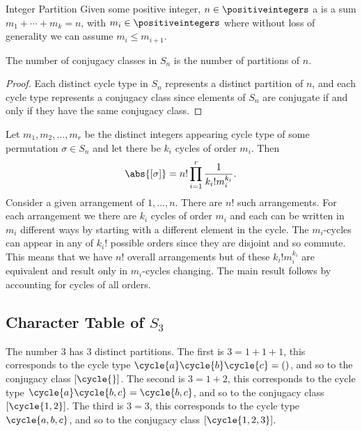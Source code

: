 \begin{dfn}{Integer Partition}{}
    Given some positive integer, \(n \in \positiveintegers\) a
     is a sum \(m_1 + \dotsb + m_k = n\), with \(m_i
    \in \positiveintegers\) where without loss of generality we can assume \(m_i \le
    m_{i + 1}\).
\end{dfn}

\begin{crl}{}{}
    The number of conjugacy classes in \(S_n\) is the number of partitions
    of \(n\).
    \begin{proof}
        Each distinct cycle type in \(S_n\) represents a distinct partition
        of \(n\), and each cycle type represents a conjugacy class since elements of
        \(S_n\) are conjugate if and only if they have the same conjugacy class.
    \end{proof}
\end{crl}

\begin{crl}{}{}
    Let \(m_1, m_2, \dotsc, m_r\) be the distinct integers appearing cycle
    type of some permutation \(\sigma \in S_n\) and let there be \(k_i\) cycles of
    order \(m_i\).
    Then
    \begin{equation}
        \abs{[\sigma]} = n! \prod_{i = 1}^{r} \frac{1}{k_i!m_i^{k_i}}.
    \end{equation}
    Consider a given arrangement of \(1, \dotsc, n\).
    There are \(n!\) such arrangements.
    For each arrangement we there are \(k_i\) cycles of order \(m_i\) and
    each can be written in \(m_i\) different ways by starting with a different
    element in the cycle.
    The \(m_i\)-cycles can appear in any of \(k_i!\) possible orders since
    they are disjoint and so commute.
    This means that we have \(n!\) overall arrangements but of these
    \(k_i!m_i^{k_i}\) are equivalent and result only in \(m_i\)-cycles changing.
    The main result follows by accounting for cycles of all orders.
\end{crl}

\subsection{Character Table of \texorpdfstring{\(S_3\)}{S3}}
The number 3 has 3 distinct partitions.
The first is \(3 = 1 + 1 + 1\), this corresponds to the cycle type
\(\cycle{a}\cycle{b}\cycle{c} = ()\), and so to the conjugacy class
\([\cycle{}]\).
The second is \(3 = 1 + 2\), this corresponds to the cycle type
\(\cycle{a}\cycle{b,c} = \cycle{b,c}\), and so to the conjugacy class
\([\cycle{1,2}]\).
The third is \(3 = 3\), this corresponds to the cycle type
\(\cycle{a,b,c}\), and so to the conjugacy class \([\cycle{1,2,3}]\).

